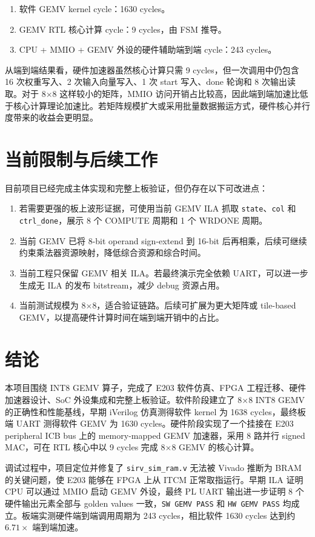 \documentclass[12pt, a4paper]{article}
\begin{document}
\begin{enumerate}
    \item 软件 GEMV kernel cycle：1630 cycles。
    \item GEMV RTL 核心计算 cycle：9 cycles，由 FSM 推导。
    \item CPU + MMIO + GEMV 外设的硬件辅助端到端 cycle：243 cycles。
\end{enumerate}

从端到端结果看，硬件加速器虽然核心计算只需 9 cycles，但一次调用中仍包含 16 次权重写入、2 次输入向量写入、1 次 start 写入、done 轮询和 8 次输出读取。对于 8$\times$8 这样较小的矩阵，MMIO 访问开销占比较高，因此端到端加速比低于核心计算理论加速比。若矩阵规模扩大或采用批量数据搬运方式，硬件核心并行度带来的收益会更明显。

\section{当前限制与后续工作}

目前项目已经完成主体实现和完整上板验证，但仍存在以下可改进点：

\begin{enumerate}
    \item 若需要更强的板上波形证据，可使用当前 GEMV ILA 抓取 \texttt{state}、\texttt{col} 和 \texttt{ctrl\_done}，展示 8 个 COMPUTE 周期和 1 个 WRDONE 周期。
    \item 当前 GEMV 已将 8-bit operand sign-extend 到 16-bit 后再相乘，后续可继续约束乘法器资源映射，降低综合资源和综合时间。
    \item 当前工程只保留 GEMV 相关 ILA。若最终演示完全依赖 UART，可以进一步生成无 ILA 的发布 bitstream，减少 debug 资源占用。
    \item 当前测试规模为 8$\times$8，适合验证链路。后续可扩展为更大矩阵或 tile-based GEMV，以提高硬件计算时间在端到端开销中的占比。
\end{enumerate}

\section{结论}

本项目围绕 INT8 GEMV 算子，完成了 E203 软件仿真、FPGA 工程迁移、硬件加速器设计、SoC 外设集成和完整上板验证。软件阶段建立了 8$\times$8 INT8 GEMV 的正确性和性能基线，早期 iVerilog 仿真测得软件 kernel 为 1638 cycles，最终板端 UART 测得软件 GEMV 为 1630 cycles。硬件阶段实现了一个挂接在 E203 peripheral ICB bus 上的 memory-mapped GEMV 加速器，采用 8 路并行 signed MAC，可在 RTL 核心中以 9 cycles 完成 8$\times$8 GEMV 的核心计算。

调试过程中，项目定位并修复了 \texttt{sirv\_sim\_ram.v} 无法被 Vivado 推断为 BRAM 的关键问题，使 E203 能够在 FPGA 上从 ITCM 正常取指运行。早期 ILA 证明 CPU 可以通过 MMIO 启动 GEMV 外设，最终 PL UART 输出进一步证明 8 个硬件输出元素全部与 golden values 一致，\texttt{SW GEMV PASS} 和 \texttt{HW GEMV PASS} 均成立。板端实测硬件端到端调用周期为 243 cycles，相比软件 1630 cycles 达到约 $6.71\times$ 端到端加速。
\end{document}
